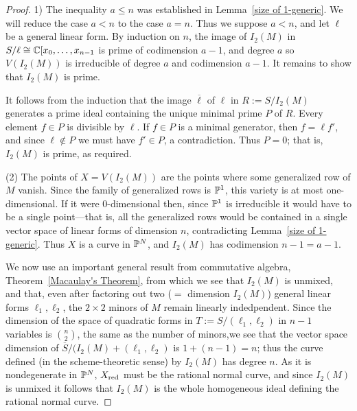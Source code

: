 %

\begin{proof} 
1) The inequality $a\leq n$ was established in Lemma~\ref{size of 1-generic}. We will reduce the case $a<n$ to the case $a=n$. Thus we suppose $a<n$, and let $\ell$ be a general linear form. By induction on $n$, the image of $I_{2}(M)$ in $S/\ell \cong \CC[x_{0},\dots, x_{n-1}$ is prime of codimension $a-1$, and degree $a$ so
$V(I_{2}(M))$ is irreducible of degree $a$ and codimension $a-1$. It remains to show
that $I_{2}(M)$ is prime.

It follows from the induction that the image $\overline \ell$ of $\ell$ in
$R :=  S/I_{2}(M)$  generates a prime ideal containing the
unique minimal prime $P$ of $R$. 
Every element $f\in P$ is divisible by $\ell$. If $f\in P$ is a minimal generator, then $f = \ell f'$, and
since $\ell\notin P$ we must have $f'\in P$, a contradiction. Thus $P = 0$; that is, $I_{2}(M)$ is
prime, as required.

(2) The points of  $X = V(I_{2}(M))$ are the points where some generalized
row of $M$ vanish. Since the family of generalized rows is $\PP^{1}$, this variety is
at most one-dimensional. If it were 0-dimensional then, since $\PP^{1}$ is irreducible
it would have to be a single point---that is, all the generalized rows would be contained
in a single vector space of linear forms of dimension $n$, contradicting Lemma~\ref{size of 1-generic}.
Thus $X$ is a curve in $\PP^{N}$, and $I_{2}(M)$ has codimension $n-1 = a-1$.

We now use an important general result from commutative algebra, Theorem~\ref{Macaulay's Theorem}, from which we see that $I_{2}(M)$ is unmixed, and that, even after factoring out two ($=$ dimension $I_{2}(M)$) general linear forms $\ell_{1}, \ell_{2}$, the $2\times 2$ minors of $M$ remain linearly indedpendent.   Since the dimension of the space of quadratic forms in 
$T := S/(\ell_{1}, \ell_{2})$ in $n-1$ variables is ${n\choose 2}$,  the same as the number of minors,we see that the vector space dimension of $\overline S/(I_{2}(M)+(\ell_{1}, \ell_{2})$
is $1+(n-1) = n$; thus the curve defined (in the scheme-theoretic sense) by $I_{2}(M)$ 
has degree $n$. As it is nondegenerate in $\PP^{N}$, $X_{\rm red}$ must be the rational normal curve, and since $I_{2}(M)$ is unmixed it follows that $I_{2}(M)$ is the whole homogeneous ideal
defining the rational normal curve.


\end{proof}
